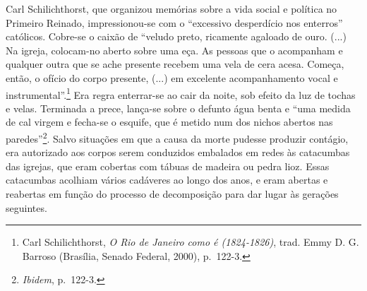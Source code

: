 Carl Schilichthorst, que organizou memórias sobre a vida social e
política no Primeiro Reinado, impressionou-se com o ``excessivo
desperdício nos enterros'' católicos. Cobre-se o caixão de ``veludo
preto, ricamente agaloado de ouro. (...) Na igreja, colocam-no aberto
sobre uma eça. As pessoas que o acompanham e qualquer outra que se ache
presente recebem uma vela de cera acesa. Começa, então, o ofício do
corpo presente, (...) em excelente acompanhamento vocal e
instrumental''.\footnote{Carl Schilichthorst, \emph{O Rio de Janeiro
  como é (1824-1826)}, trad. Emmy D. G. Barroso (Brasília, Senado
  Federal, 2000), p.~122-3.} Era regra enterrar-se ao cair da noite, sob
efeito da luz de tochas e velas. Terminada a prece, lança-se sobre o
defunto água benta e ``uma medida de cal virgem e fecha-se o esquife,
que é metido num dos nichos abertos nas paredes''\footnote{\emph{Ibidem},
  p.~122-3.}. Salvo situações em que a causa da morte pudesse produzir
contágio, era autorizado aos corpos serem conduzidos embalados em redes
às catacumbas das igrejas, que eram cobertas com tábuas de madeira ou
pedra lioz. Essas catacumbas acolhiam vários cadáveres ao longo dos
anos, e eram abertas e reabertas em função do processo de decomposição
para dar lugar às gerações seguintes.

